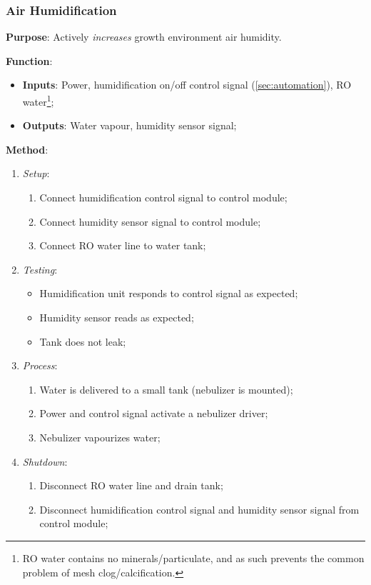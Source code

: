 \documentclass{report}
\begin{document}
\subsubsection{Air Humidification}
\label{sec:airhum}

\textbf{Purpose}: Actively \textit{increases} growth environment air humidity.

\textbf{Function}:
\begin{itemize}
    \item \textbf{Inputs}: Power, humidification on/off control signal (\ref{sec:automation}), RO water\footnote{RO water contains no minerals/particulate, and as such prevents the common problem of mesh clog/calcification.};
    \item \textbf{Outputs}: Water vapour, humidity sensor signal;
\end{itemize}

\textbf{Method}:
\begin{enumerate}
    \item \textit{Setup}:
    \begin{enumerate}
        \item Connect humidification control signal to control module;
        \item Connect humidity sensor signal to control module;
        \item Connect RO water line to water tank;
    \end{enumerate}
    \item \textit{Testing}:
    \begin{itemize}
        \item Humidification unit responds to control signal as expected;
        \item Humidity sensor reads as expected;
        \item Tank does not leak;
    \end{itemize}
    \item \textit{Process}:
    \begin{enumerate}
        \item Water is delivered to a small tank (nebulizer is mounted);
        \item Power and control signal activate a nebulizer driver;
        \item Nebulizer vapourizes water;
    \end{enumerate}
    \item \textit{Shutdown}:
    \begin{enumerate}
        \item Disconnect RO water line and drain tank;
        \item Disconnect humidification control signal and humidity sensor signal from control module;
    \end{enumerate}
\end{enumerate}
\end{document}
